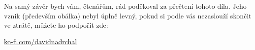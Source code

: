 Na samý závěr bych vám, čtenářům, rád poděkoval za přečtení tohoto díla. Jeho vznik (především obálka) nebyl úplně levný, pokud si podle vás nezaslouží skončit ve ztrátě, můžete ho podpořit zde:

\href{https://ko-fi.com/davidnadrchal}{ko-fi.com/davidnadrchal}
